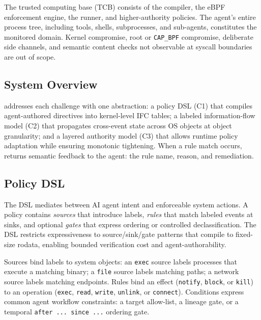 The trusted computing base (TCB) consists of the compiler, the eBPF
enforcement engine, the runner, and higher-authority policies. The agent's
entire process tree, including tools, shells, subprocesses, and
sub-agents, constitutes the monitored domain. Kernel compromise, root or
\texttt{CAP\_BPF} compromise, deliberate side channels, and semantic
content checks not observable at syscall boundaries are out of scope.

\subsection{System Overview}

\sys{} addresses each challenge with one abstraction: a policy DSL
(C1) that compiles agent-authored directives into kernel-level IFC
tables; a labeled information-flow model (C2) that propagates cross-event
state across OS objects at object granularity; and a layered authority
model (C3) that allows runtime policy adaptation while ensuring monotonic
tightening. When a rule match occurs, \sys{} returns semantic
feedback to the agent: the rule name, reason, and remediation.

\subsection{Policy DSL}
\label{sec:dsl}

The DSL mediates between AI agent intent and enforceable system actions.
A policy contains \emph{sources} that introduce labels,
\emph{rules} that match labeled events at sinks, and optional
\emph{gates} that express ordering or controlled declassification. The
DSL restricts expressiveness to source/sink/gate patterns that compile
to fixed-size rodata, enabling bounded verification cost and
agent-authorability.

Sources bind labels to system objects: an \texttt{exec} source labels
processes that execute a matching binary; a \texttt{file} source labels
matching paths; a network source labels matching endpoints. Rules bind an
effect (\texttt{notify}, \texttt{block}, or \texttt{kill}) to an
operation (\texttt{exec}, \texttt{read}, \texttt{write},
\texttt{unlink}, or \texttt{connect}). Conditions express common agent
workflow constraints: a target allow-list, a lineage gate, or a temporal
\texttt{after~...~since~...} ordering gate.

